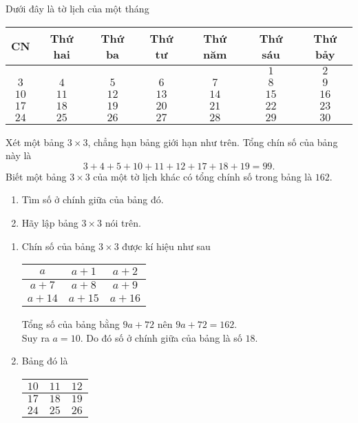 \begin{bt}
	Dưới đây là tờ lịch của một tháng
	\begin{center}
		\begin{tabular}{|c|c|c|c|c|c|c|}
		\hline
		CN&Thứ hai&Thứ ba&Thứ tư&Thứ năm&Thứ sáu&Thứ bảy\\
		\hline
		&&&&&$1$&$2$\\
		\cline{1-3}
		$3$&$4$&$5$&$6$&$7$&$8$&$9$\\
		$10$&$11$&$12$&$13$&$14$&$15$&$16$\\
		$17$&$18$&$19$&$20$&$21$&$22$&$23$\\
		\cline{1-3}
		$24$&$25$&$26$&$27$&$28$&$29$&$30$\\
		\hline
		\end{tabular}
	\end{center}
	Xét một bảng $3 \times 3$, chẳng hạn bảng giới hạn như trên. Tổng chín số của bảng này là 
	\[3+4+5+10+11+12+17+18+19=99.\]
	Biết một bảng $3 \times 3$ của một tờ lịch khác có tổng chính số trong bảng là $162$.
	\begin{enumerate}
		\item Tìm số ở chính giữa của bảng đó.
		\item Hãy lập bảng $3 \times 3$ nói trên.
	\end{enumerate}
	\loigiai
	{
		\begin{enumerate}
			\item Chín số của bảng $3 \times 3$ được kí hiệu như sau
				\begin{center}
					\begin{tabular}{|c|c|c|}
						\hline
						$a$&$a+1$&$a+2$\\
						\hline
						$a+7$&$a+8$&$a+9$\\
						\hline
						$a+14$&$a+15$&$a+16$\\
						\hline 
					\end{tabular}
				\end{center}
				Tổng số của bảng bằng $9a+72$ nên $9a+72 = 162$.\\
				Suy ra $a=10$. Do đó số ở chính giữa của bảng là số $18$.
			\item Bảng đó là
				\begin{center}
					\begin{tabular}{|c|c|c|}
						\hline
						$10$&$11$&$12$\\
						\hline
						$17$&$18$&$19$\\
						\hline
						$24$&$25$&$26$\\
						\hline
					\end{tabular}
				\end{center}
		\end{enumerate}
	}
\end{bt}
